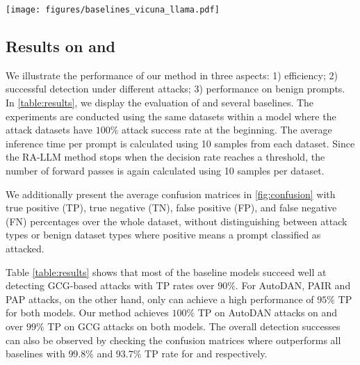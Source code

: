 \begin{figure*}[t]
\centering
\texttt{[image: figures/baselines\_vicuna\_llama.pdf]}
    \caption{Confusion matrices showing true positive (TP), true negative (TN), false positive (FP), and false negative (FN) percentages to compare \methodname{} with previous works. While the upper graph is for \llama{}, the lower one is plotted for \vicuna{}. Higher TP and lower FP indicate a better performance and \methodname{} achieves better rates than any other methods for both models. }
\label{fig:confusion}
\vskip -0.2in
\end{figure*}

\subsection{Results on \llama{} and \vicuna{}}
\label{subsec:results}

We illustrate the performance of our method in three aspects:
1) efficiency; 2) successful detection under different attacks; 3) performance on benign prompts. In \cref{table:results}, we display the evaluation of \methodname{} and several baselines. The experiments are conducted using the same datasets within a model where the attack datasets have $100\%$ attack success rate at the beginning. The average inference time per prompt is calculated using 10 samples from each dataset. Since the  RA-LLM method stops when the decision rate reaches a threshold, the number of forward passes is again calculated using 10 samples per dataset.

We additionally present the average confusion matrices in \cref{fig:confusion} with true positive (TP), true negative (TN), false positive (FP), and false negative (FN) percentages over the whole dataset, without distinguishing between attack types or benign dataset types where positive means a prompt classified as attacked. 

Table \ref{table:results} shows that most of the baseline models succeed well at detecting GCG-based attacks with TP rates over $90\%$. For AutoDAN, PAIR and PAP attacks, on the other hand, only \methodname{} can achieve a high performance of $95\%$ TP for both models. Our method achieves $100\%$ TP on AutoDAN attacks on \llama{} and over $99\%$ TP on GCG attacks on both models. The overall detection successes can also be observed by checking the confusion matrices where \methodname{} outperforms all baselines with $99.8\%$ and $93.7\%$ TP rate for \llama{} and \vicuna{} respectively.

